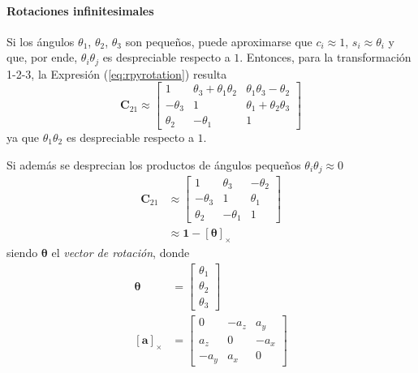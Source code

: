\paragraph{Rotaciones infinitesimales} Si los ángulos $\theta_1$, $\theta_2$, $\theta_3$ son pequeños, puede aproximarse que $c_i \approx 1$, $s_i \approx \theta_i$ y que, por ende, $\theta_i\theta_j$ es despreciable respecto a $1$. Entonces, para la transformación 1-2-3, la Expresión (\ref{eq:rpyrotation}) resulta
\begin{equation}
    \bm{C}_{21} \approx
    \begin{bmatrix}
        1 & \theta_3 + \theta_1\theta_2 & \theta_1\theta_3 - \theta_2 \\
        -\theta_3 & 1 & \theta_1 + \theta_2\theta_3 \\
        \theta_2 & -\theta_1 & 1
    \end{bmatrix}
    \label{eq:rpyinfinitesimal}
\end{equation}
ya que $\theta_1\theta_2$ es despreciable respecto a $1$.

Si además se desprecian los productos de ángulos pequeños $\theta_i\theta_j \approx 0$
\begin{align}
    \bm{C}_{21} &\approx
    \begin{bmatrix}
        1 & \theta_3 & -\theta_2 \\
        -\theta_3 & 1 & \theta_1 \\
        \theta_2 & -\theta_1 & 1
    \end{bmatrix}
    \label{eq:rpyinfinitesimalreduced}
    \\
    &\approx \bm{1} - \left[\bm{\theta}\right]_\times
\end{align}
siendo $\bm{\theta}$ el \textit{vector de rotación}, donde
\begin{align}
    \bm{\theta} &=
    \begin{bmatrix}
        \theta_1 \\
        \theta_2 \\
        \theta_3
    \end{bmatrix}
    \\
    \left[\bm{a}\right]_\times &= 
    \begin{bmatrix}
        0 & -a_z & a_y \\
        a_z & 0 & -a_x \\
        -a_y & a_x & 0
    \end{bmatrix}
\end{align}

